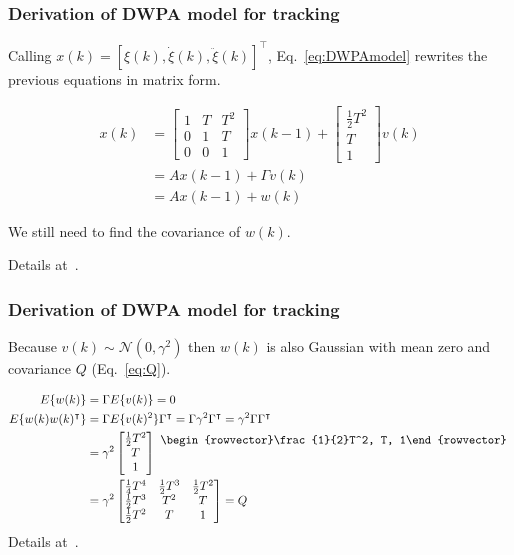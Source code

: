 \begin{frame}
    \frametitle{Derivation of DWPA model for tracking}

    Calling $x(k)=[\xi(k), \dot{\xi}(k), \ddot{\xi}(k)]^\intercal$,
    Eq.~\ref{eq:DWPAmodel} rewrites the previous
    equations in matrix form.

    \begin{align}
        x(k)&=\begin{bmatrix}
            1 & T & T^2\\
            0 & 1 & T\\
            0 & 0 & 1
            \end{bmatrix}
           x(k-1)+
           \begin{bmatrix}
               \frac{1}{2}T^2\\
               T\\
               1
           \end{bmatrix}
           v(k)\nonumber\\
           &=Ax(k-1)+\Gamma v(k)\nonumber\\
           &=Ax(k-1)+w(k)\label{eq:DWPAmodel}
    \end{align}

    We still need to find the covariance of $w(k)$.

    \hfill\tiny Details at~\citet{rapela26}.

\end{frame}

\begin{frame}
    \frametitle{Derivation of DWPA model for tracking}

    Because $v(k)\sim\mathcal{N}(0,\gamma^2)$ then $w(k)$ is also Gaussian with
    mean zero and covariance $Q$ (Eq.~\ref{eq:Q}).

    \begin{align}
        E\{w(k)\}&=\Gamma E\{v(k)\}=0\nonumber{}\\
        E\{w(k)w(k)^\intercal\}&=\Gamma E\{v(k)^2\}\Gamma^\intercal=\Gamma\gamma^2\Gamma^\intercal=\gamma^2\Gamma\Gamma^\intercal\nonumber\\
        &=\gamma^2\begin{bmatrix}
            \frac{1}{2}T^2\\
            T\\
            1
        \end{bmatrix}
        \raisebox{2.5ex}{
            $\begin{rowvector}\frac{1}{2}T^2, T, 1\end{rowvector}$
        }\nonumber\\
        &=\gamma^2\begin{bmatrix}
                    \frac{1}{4}T^4&\frac{1}{2}T^3&\frac{1}{2}T^2\\
                    \frac{1}{2}T^3&T^2&T\\
                    \frac{1}{2}T^2&T&1
        \end{bmatrix}=Q
        \label{eq:Q}
    \end{align}
    \hfill\tiny Details at~\citet{rapela26}.

\end{frame}

